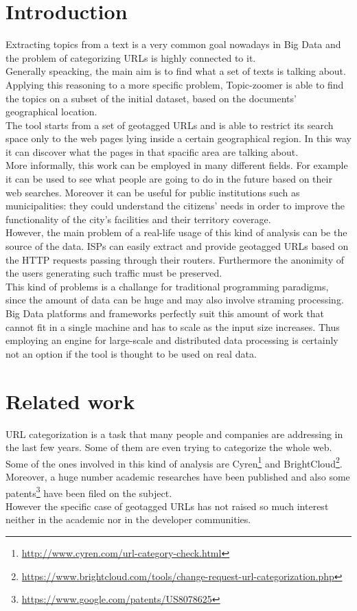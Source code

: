 \documentclass{sig-alternate-05-2015}
\begin{document}
\section{Introduction}
Extracting topics from a text is a very common goal nowadays in Big Data and the problem of categorizing URLs is highly connected to it.\\
Generally speacking, the main aim is to find what a set of texts is talking about. Applying this reasoning to a more specific problem, Topic-zoomer is able to find the topics on a subset of the initial dataset, based on the documents' geographical location.\\
The tool starts from a set of geotagged URLs and is able to restrict its search space only to the web pages lying inside a certain geographical region. In this way it can discover what the pages in that spacific area are talking about.\\
More informally, this work can be employed in many different fields. For example it can be used to see what people are going to do in the future based on their web searches. Moreover it can be useful for public institutions such as municipalities: they could understand the citizens' needs in order to improve the functionality of the city's facilities and their territory coverage.\\
However, the main problem of a real-life usage of this kind of analysis can be the source of the data. ISPs can easily extract and provide geotagged URLs based on the HTTP requests passing through their routers. Furthermore the anonimity of the users generating such traffic must be preserved.\\
This kind of problems is a challange for traditional programming paradigms, since the amount of data can be huge and may also involve straming  processing. Big Data platforms and frameworks perfectly suit this amount of work that cannot fit in a single machine and has to scale as the input size increases. Thus employing an engine for large-scale and distributed data processing is certainly not an option if the tool is thought to be used on real data.        


\section{Related work}
URL categorization is a task that many people and companies are addressing in the last few years. Some of them are even trying to categorize the whole web. Some of the ones involved in this kind of analysis are Cyren\footnote{\url{http://www.cyren.com/url-category-check.html}} and BrightCloud\footnote{\url{https://www.brightcloud.com/tools/change-request-url-categorization.php}}. Moreover, a huge number academic researches have been published and also some patents\footnote{\url{https://www.google.com/patents/US8078625}} have been filed on the subject.\\
However the specific case of geotagged URLs has not raised so much interest neither in the academic nor in the developer communities.
\end{document}
